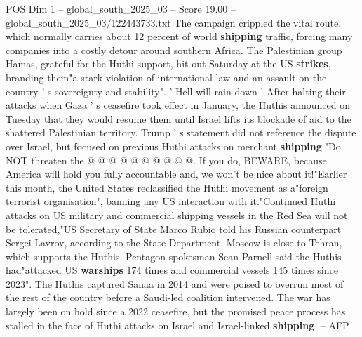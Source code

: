 \begin{textsample}{POS Dim 1 – global\_south\_2025\_03 – Score 19.00 – global\_south\_2025\_03/122443733.txt}
The campaign crippled the vital route, which normally carries about 12 percent of world \textbf{shipping} traffic, forcing many companies into a costly detour around southern Africa.
The Palestinian group Hamas, grateful for the Huthi support, hit out Saturday at the US \textbf{strikes}, branding them"a stark violation of international law and an assault on the country ' s sovereignty and stability". ' Hell will rain down ' After halting their attacks when Gaza ' s ceasefire took effect in January, the Huthis announced on Tuesday that they would resume them until Israel lifts its blockade of aid to the shattered Palestinian territory.
Trump ' s statement did not reference the dispute over Israel, but focused on previous Huthi attacks on merchant \textbf{shipping}."Do NOT threaten the @ @ @ @ @ @ @ @ @ @.
If you do, BEWARE, because America will hold you fully accountable and, we won't be nice about it!"Earlier this month, the United States reclassified the Huthi movement as a"foreign terrorist organisation", banning any US interaction with it."Continued Huthi attacks on US military and commercial shipping vessels in the Red Sea will not be tolerated,"US Secretary of State Marco Rubio told his Russian counterpart Sergei Lavrov, according to the State Department.
Moscow is close to Tehran, which supports the Huthis.
Pentagon spokesman Sean Parnell said the Huthis had"attacked US \textbf{warships} 174 times and commercial vessels 145 times since 2023".
The Huthis captured Sanaa in 2014 and were poised to overrun most of the rest of the country before a Saudi-led coalition intervened.
The war has largely been on hold since a 2022 ceasefire, but the promised peace process has stalled in the face of Huthi attacks on Israel and Israel-linked \textbf{shipping}. -- AFP

\end{textsample}
